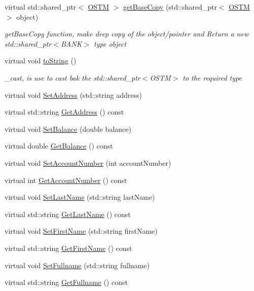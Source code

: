 \begin{DoxyCompactItemize}
virtual std\+::shared\+\_\+ptr$<$ \hyperlink{class_o_s_t_m}{O\+S\+TM} $>$ \hyperlink{class_s_w_b_p_l_c_a77f0e0d6c08a95066d277bf6b2073a5c}{get\+Base\+Copy} (std\+::shared\+\_\+ptr$<$ \hyperlink{class_o_s_t_m}{O\+S\+TM} $>$ object)
\begin{DoxyCompactList}\small\item\em get\+Base\+Copy function, make deep copy of the object/pointer and Return a new std\+::shared\+\_\+ptr$<$\+B\+A\+N\+K$>$ type object \end{DoxyCompactList}\item 
virtual void \hyperlink{class_s_w_b_p_l_c_a761c77b5a204b4ae05ffb01bd602c3c2}{to\+String} ()
\begin{DoxyCompactList}\small\item\em \+\_\+cast, is use to cast bak the std\+::shared\+\_\+ptr$<$\+O\+S\+T\+M$>$ to the required type \end{DoxyCompactList}\item 
virtual void \hyperlink{class_s_w_b_p_l_c_a99590e47dda8361b2d5869fd315f92f8}{Set\+Address} (std\+::string address)
\item 
virtual std\+::string \hyperlink{class_s_w_b_p_l_c_a3a62a57b3ecdd06ed977ef372dab89ad}{Get\+Address} () const 
\item 
virtual void \hyperlink{class_s_w_b_p_l_c_a9a0d94da8922f00ca4a3e5fa774e8b3f}{Set\+Balance} (double balance)
\item 
virtual double \hyperlink{class_s_w_b_p_l_c_af7f5f662ab926bfb9c0c1c7156cde24c}{Get\+Balance} () const 
\item 
virtual void \hyperlink{class_s_w_b_p_l_c_a45eb1e6a73fde0dc00824319d4e0b81a}{Set\+Account\+Number} (int account\+Number)
\item 
virtual int \hyperlink{class_s_w_b_p_l_c_a1a997f6d333e5021970e50605431d7df}{Get\+Account\+Number} () const 
\item 
virtual void \hyperlink{class_s_w_b_p_l_c_aa5581ea5d2e0315b816876737e887f09}{Set\+Last\+Name} (std\+::string last\+Name)
\item 
virtual std\+::string \hyperlink{class_s_w_b_p_l_c_a72b2595acea28dae9e4f5816dd3c4652}{Get\+Last\+Name} () const 
\item 
virtual void \hyperlink{class_s_w_b_p_l_c_a8146eabca4648ef679188904f677df9d}{Set\+First\+Name} (std\+::string first\+Name)
\item 
virtual std\+::string \hyperlink{class_s_w_b_p_l_c_ace6bbcd6546896e581e3a2ee9504d090}{Get\+First\+Name} () const 
\item 
virtual void \hyperlink{class_s_w_b_p_l_c_a09376d46475bbceda897948714ff1e72}{Set\+Fullname} (std\+::string fullname)
\item 
virtual std\+::string \hyperlink{class_s_w_b_p_l_c_adb74b3cbc40a401bf7ca4dfb5269c336}{Get\+Fullname} () const 
\end{DoxyCompactItemize}


